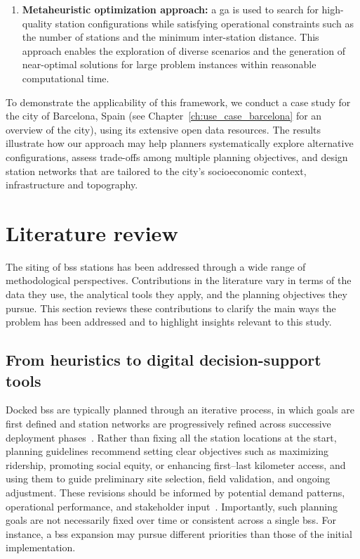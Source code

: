 \begin{enumerate}
    \item \textbf{Metaheuristic optimization approach:} a \ac{ga} is used to search for high-quality station configurations while satisfying operational constraints such as the number of stations and the minimum inter-station distance. This approach enables the exploration of diverse scenarios and the generation of near-optimal solutions for large problem instances within reasonable computational time.

\end{enumerate}

To demonstrate the applicability of this framework, we conduct a case study for the city of Barcelona, Spain (see Chapter~\ref{ch:use_case_barcelona} for an overview of the city), using its extensive open data resources. The results illustrate how our approach may help planners systematically explore alternative configurations, assess trade-offs among multiple planning objectives, and design station networks that are tailored to the city's socioeconomic context, infrastructure and topography.

\section{Literature review}

The siting of \ac{bss} stations has been addressed through a wide range of methodological perspectives. Contributions in the literature vary in terms of the data they use, the analytical tools they apply, and the planning objectives they pursue. This section reviews these contributions to clarify the main ways the problem has been addressed and to highlight insights relevant to this study.

    \subsection[From heuristics to digital decision-support tools]{From heuristics to digital decision-support tools}

Docked \ac{bss} are typically planned through an iterative process, in which goals are first defined and station networks are progressively refined across successive deployment phases~\cite{Duran-Rodas2021, Ferrando2007, Yanocha2018}. Rather than fixing all the station locations at the start, planning guidelines recommend setting clear objectives such as maximizing ridership, promoting social equity, or enhancing first–last kilometer access, and using them to guide preliminary site selection, field validation, and ongoing adjustment. These revisions should be informed by potential demand patterns, operational performance, and stakeholder input~\cite{Ferrando2007, Yanocha2018}. Importantly, such planning goals are not necessarily fixed over time or consistent across a single \ac{bss}. For instance, a \ac{bss} expansion may pursue different priorities than those of the initial implementation.

